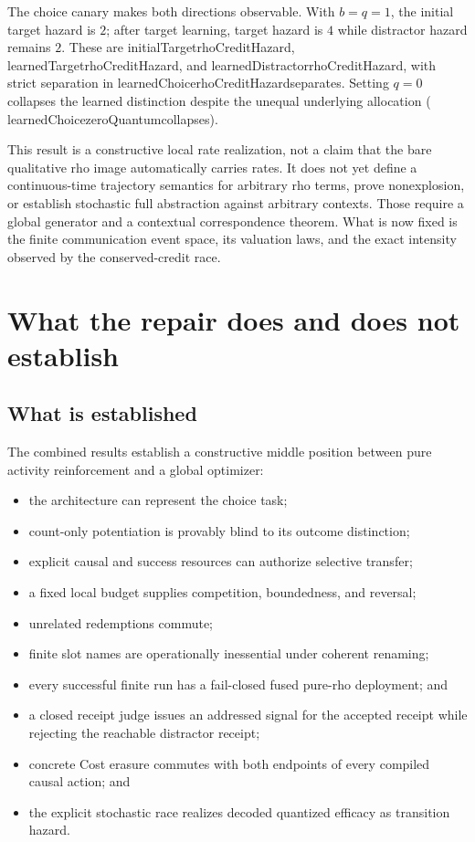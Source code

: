 \documentclass[11pt]{article}
\newcommand{\leanname}[1]{{\scriptsize\ttfamily
  \def\_{\textunderscore\allowbreak}#1}}
\begin{document}
The choice canary makes both directions observable.  With \(b=q=1\), the
initial target hazard is \(2\); after target learning, target hazard is \(4\)
while distractor hazard remains \(2\).  These are
\leanname{initialTarget\_rhoCreditHazard},
\leanname{learnedTarget\_rhoCreditHazard}, and
\leanname{learnedDistractor\_rhoCreditHazard}, with strict separation in
\leanname{learnedChoice\_rhoCreditHazard\_separates}.  Setting \(q=0\)
collapses the learned distinction despite the unequal underlying allocation
(\leanname{learnedChoice\_zeroQuantum\_collapses}).

This result is a constructive local rate realization, not a claim that the
bare qualitative rho image automatically carries rates.  It does not yet
define a continuous-time trajectory semantics for arbitrary rho terms, prove
nonexplosion, or establish stochastic full abstraction against arbitrary
contexts.  Those require a global generator and a contextual correspondence
theorem.  What is now fixed is the finite communication event space, its
valuation laws, and the exact intensity observed by the conserved-credit
race.

\section{What the repair does and does not establish}
\label{sec:scope}

\subsection{What is established}

The combined results establish a constructive middle position between pure
activity reinforcement and a global optimizer:

\begin{itemize}
\item the architecture can represent the choice task;
\item count-only potentiation is provably blind to its outcome distinction;
\item explicit causal and success resources can authorize selective transfer;
\item a fixed local budget supplies competition, boundedness, and reversal;
\item unrelated redemptions commute;
\item finite slot names are operationally inessential under coherent
  renaming;
\item every successful finite run has a fail-closed fused pure-rho deployment;
  and
\item a closed receipt judge issues an addressed signal for the accepted
  receipt while rejecting the reachable distractor receipt;
\item concrete Cost erasure commutes with both endpoints of every compiled
  causal action; and
\item the explicit stochastic race realizes decoded quantized efficacy as
  transition hazard.
\end{itemize}
\end{document}
